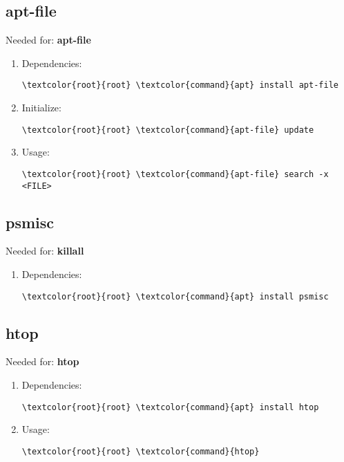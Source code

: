 \documentclass[10pt, a4paper, onecolumn, openany]{book} %
\begin{document}
\subsection{apt-file}
Needed for: \textbf{apt-file}
\begin{enumerate}
    \item Dependencies:
\begin{Verbatim}[commandchars=\\\{\}]
\textcolor{root}{root} \textcolor{command}{apt} install apt-file
\end{Verbatim}
    \item Initialize:
\begin{Verbatim}[commandchars=\\\{\}]
\textcolor{root}{root} \textcolor{command}{apt-file} update
\end{Verbatim}
    \item Usage:
\begin{Verbatim}[commandchars=\\\{\}]
\textcolor{root}{root} \textcolor{command}{apt-file} search -x <FILE>
\end{Verbatim}
\end{enumerate}
\subsection{psmisc}
Needed for: \textbf{killall}
\begin{enumerate}
    \item Dependencies:
\begin{Verbatim}[commandchars=\\\{\}]
\textcolor{root}{root} \textcolor{command}{apt} install psmisc
\end{Verbatim}
\end{enumerate}
\subsection{htop}
Needed for: \textbf{htop}
\begin{enumerate}
    \item Dependencies:
\begin{Verbatim}[commandchars=\\\{\}]
\textcolor{root}{root} \textcolor{command}{apt} install htop
\end{Verbatim}
    \item Usage:
\begin{Verbatim}[commandchars=\\\{\}]
\textcolor{root}{root} \textcolor{command}{htop}
\end{Verbatim}
\end{enumerate}
\end{document}
